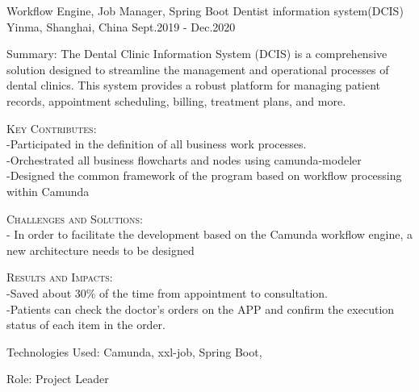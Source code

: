 \begin{cventries}
{\begin{cvitems}
      \end{cvitems}
    }
  \cventry
    {Workflow Engine, Job Manager, Spring Boot} %
    {Dentist information system({DCIS})} %
    {Yinma, Shanghai, China} %
    {Sept.2019 - Dec.2020} %
    {
      \begin{cvitems} %
        \item {Summary: The Dental Clinic Information System (DCIS) is a comprehensive solution designed to streamline the management and operational processes of dental clinics. This system provides a robust platform for managing patient records, appointment scheduling, billing, treatment plans, and more.}
        \item {\textsc{Key Contributes}:  \\-Participated in the definition of all business work processes. \\-Orchestrated all business flowcharts and nodes using camunda-modeler \\-Designed the common framework of the program based on workflow processing within Camunda}
        \item {\textsc{Challenges and Solutions}: \\- In order to facilitate the development based on the Camunda workflow engine, a new architecture needs to be designed}
        \item {\textsc{Results and Impacts}: \\-Saved about 30\% of the time from appointment to  consultation. \\-Patients can check the doctor's orders on the APP and confirm the execution status of each item in the order.}
        \item {Technologies Used: Camunda, xxl-job, Spring Boot, }
        \item {Role: Project Leader}
      \end{cvitems}
    }




\end{cventries}
